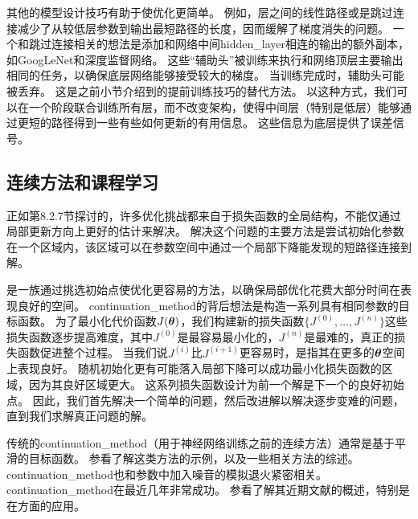 其他的模型设计技巧有助于使优化更简单。
例如，层之间的线性路径或是跳过连接减少了从较低层参数到输出最短路径的长度，因而缓解了梯度消失的问题\citep{Srivastava-et-al-arxiv2015}。
一个和跳过连接相关的想法是添加和网络中间\gls{hidden_layer}相连的输出的额外副本，如GoogLeNet\citep{Szegedy-et-al-arxiv2014}和深度监督网络\citep{Lee-et-al-2014}。
这些``辅助头''被训练来执行和网络顶层主要输出相同的任务，以确保底层网络能够接受较大的梯度。
当训练完成时，辅助头可能被丢弃。
这是之前小节介绍到的提前训练技巧的替代方法。
以这种方式，我们可以在一个阶段联合训练所有层，而不改变架构，使得中间层（特别是低层）能够通过更短的路径得到一些有些如何更新的有用信息。
这些信息为底层提供了误差信号。


\subsection{连续方法和课程学习}
\label{sec:continuation_methods_and_curriculum_learning}
正如第8.2.7节探讨的，许多优化挑战都来自于损失函数的全局结构，不能仅通过局部更新方向上更好的估计来解决。
解决这个问题的主要方法是尝试初始化参数在一个区域内，该区域可以在参数空间中通过一个局部下降能发现的短路径连接到解。

是一族通过挑选初始点使优化更容易的方法，以确保局部优化花费大部分时间在表现良好的空间。
\gls{continuation_method}的背后想法是构造一系列具有相同参数的目标函数。
为了最小化代价函数$J(\boldsymbol{\theta})$，我们构建新的损失函数$\{J^{(0)},\dots,J^{(n)}\}$这些损失函数逐步提高难度，其中$J^{(0)}$是最容易最小化的，$J^{(n)}$是最难的，真正的损失函数促进整个过程。
当我们说$J^{(i)}$比$J^{(i+1)}$更容易时，是指其在更多的$\boldsymbol{\theta}$空间上表现良好。
随机初始化更有可能落入局部下降可以成功最小化损失函数的区域，因为其良好区域更大。
这系列损失函数设计为前一个解是下一个的良好初始点。
因此，我们首先解决一个简单的问题，然后改进解以解决逐步变难的问题，直到我们求解真正问题的解。

传统的\gls{continuation_method}（用于神经网络训练之前的连续方法）通常是基于平滑的目标函数。
参看\cite{Wu-97}了解这类方法的示例，以及一些相关方法的综述。
\gls{continuation_method}也和参数中加入噪音的模拟退火紧密相关\citep{Kirkpatrick83}。
\gls{continuation_method}在最近几年非常成功。
参看\cite{Mobahi+Fisher-AAAI2015}了解其近期文献的概述，特别是在方面的应用。


